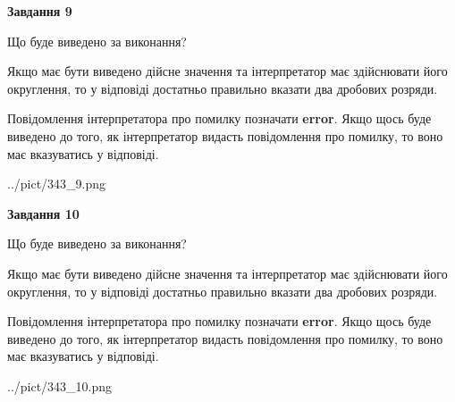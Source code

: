 \documentclass[12pt, ukrainian]{article}
\begin{document}
{\begin {Large}
{\begin {center}\textbf{Завдання 9}\end {center}}\par
Що буде виведено за виконання? \par

Якщо має бути виведено дійсне значення та інтерпретатор має здійснювати його округлення, 
то у відповіді достатньо правильно вказати два дробових розряди.

Повідомлення інтерпретатора про помилку позначати \textbf{error}.
Якщо щось буде виведено до того, як інтерпретатор видасть повідомлення про помилку, 
то воно має вказуватись у відповіді. \par

\begin{center}
	{../pict/343_9.png}
\end{center}
\newpage

{\begin {center}\textbf{Завдання 10}\end {center}}\par
Що буде виведено за виконання? \par

Якщо має бути виведено дійсне значення та інтерпретатор має здійснювати його округлення, 
то у відповіді достатньо правильно вказати два дробових розряди.

Повідомлення інтерпретатора про помилку позначати \textbf{error}.
Якщо щось буде виведено до того, як інтерпретатор видасть повідомлення про помилку, 
то воно має вказуватись у відповіді. \par

\begin{center}
	{../pict/343_10.png}
\end{center}
\newpage

\end {Large}}
\end{document}
